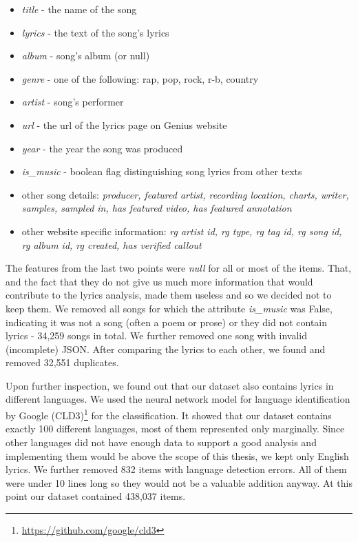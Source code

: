 \begin{itemize}
	\item \textit{title} - the name of the song
	\item \textit{lyrics} - the text of the song's lyrics
	\item \textit{album} - song's album (or null)
	\item \textit{genre} - one of the following: rap, pop, rock, r-b, country
	\item \textit{artist} - song's performer
	\item \textit{url} - the url of the lyrics page on Genius website
	\item \textit{year} - the year the song was produced
	\item \textit{is\_music} - boolean flag distinguishing song lyrics from other texts
	\item other song details: \textit{producer, featured artist, recording location, charts, writer, samples, sampled in, has featured video, has featured annotation}
	\item other website specific information: \textit{rg artist id, rg type, rg tag id, rg song id, rg album id, rg created, has verified callout}	
\end{itemize}

The features from the last two points were \textit{null} for all or most of the items. That, and the fact that they do not give us much more information that would contribute to the lyrics analysis, made them useless and so we decided not to keep them. We removed all songs for which the attribute \textit{is\_music} was False, indicating it was not a song (often a poem or prose) or they did not contain lyrics - 34,259 songs in total. We further removed one song with invalid (incomplete) JSON. After comparing the lyrics to each other, we found and removed 32,551 duplicates.

Upon further inspection, we found out that our dataset also contains lyrics in different languages. We used the neural network model for language identification by Google (CLD3)\footnote{\url{https://github.com/google/cld3}} for the classification. It showed that our dataset contains exactly 100 different languages, most of them represented only marginally. Since other languages did not have enough data to support a good analysis and implementing them would be above the scope of this thesis, we kept only English lyrics. We further removed 832 items with language detection errors. All of them were under 10 lines long so they would not be a valuable addition anyway. At this point our dataset contained 438,037 items.

